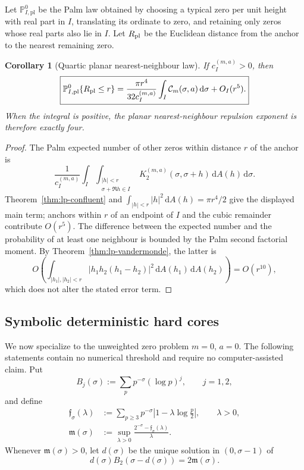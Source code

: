 \documentclass[11pt]{article}
\newtheorem{corollary}[theorem]{Corollary}
\theoremstyle{definition}
\theoremstyle{remark}
\newcommand{\dd}{\,\mathrm d}
\begin{document}
Let ${\mathbb P}_{I,\mathrm{pl}}^0$ be the Palm law obtained by choosing a
typical zero per unit height with real part in $I$, translating its ordinate to
zero, and retaining only zeros whose real parts also lie in $I$.  Let
$R_{\rm pl}$ be the Euclidean distance from the anchor to the nearest remaining
zero.

\begin{corollary}[Quartic planar nearest-neighbour law]
\label{cor:lp-quartic-nn}
If $c_I^{(m,a)}>0$, then
\begin{equation}
 \boxed{
 {\mathbb P}_{I,\mathrm{pl}}^0\{R_{\rm pl}\leq r\}
 =\frac{\pi r^4}{32c_I^{(m,a)}}
   \int_I\mathcal C_m(\sigma,a)\dd\sigma
   +O_I(r^5).
 }
 \label{eq:lp-quartic-nn}
\end{equation}
When the integral is positive, the planar nearest-neighbour repulsion exponent
is therefore exactly four.
\end{corollary}

\begin{proof}
The Palm expected number of other zeros within distance $r$ of the anchor is
\[
 \frac1{c_I^{(m,a)}}\int_I
 \int_{\substack{|h|<r\\\sigma+\Re h\in I}}
 K_2^{(m,a)}(\sigma,\sigma+h)\dd A(h)\dd\sigma.
\]
Theorem~\ref{thm:lp-confluent} and
$\int_{|h|<r}|h|^2\dd A(h)=\pi r^4/2$ give the displayed main term; anchors
within $r$ of an endpoint of $I$ and the cubic remainder contribute $O(r^5)$.
The difference between the expected number and the probability of at least one
neighbour is bounded by the Palm second factorial moment.  By
Theorem~\ref{thm:lp-vandermonde}, the latter is
\[
 O\!\left(\int_{|h_1|,|h_2|<r}
 |h_1h_2(h_1-h_2)|^2\dd A(h_1)\dd A(h_2)\right)=O(r^{10}),
\]
which does not alter the stated error term.
\end{proof}

\subsection{Symbolic deterministic hard cores}

We now specialize to the unweighted zero problem $m=0$, $a=0$.  The following
statements contain no numerical threshold and require no computer-assisted
claim.  Put
\begin{equation}
 B_j(\sigma):=\sum_pp^{-\sigma}(\log p)^j,
 \qquad j=1,2,
 \label{eq:lp-Bj}
\end{equation}
and define
\begin{align}
 \mathfrak f_\sigma(\lambda)
 &:=\sum_{p\geq3}p^{-\sigma}
      \left|1-\lambda\log\frac p2\right|,\qquad \lambda>0,
 \label{eq:lp-fsigma}\\
 \mathfrak m(\sigma)
 &:=\sup_{\lambda>0}
    \frac{2^{-\sigma}-\mathfrak f_\sigma(\lambda)}{\lambda}.
 \label{eq:lp-msigma}
\end{align}
Whenever $\mathfrak m(\sigma)>0$, let $d(\sigma)$ be the unique solution in
$(0,\sigma-1)$ of
\begin{equation}
 d(\sigma)B_2(\sigma-d(\sigma))=2\mathfrak m(\sigma).
 \label{eq:lp-dsigma}
\end{equation}
\end{document}
